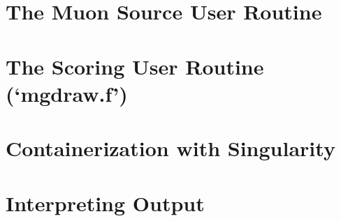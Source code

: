 \documentclass[10pt]{article}
\begin{document}
\part*{The Muon Source User Routine}

\part*{The Scoring User Routine (`mgdraw.f')}

\part*{Containerization with Singularity}

\part*{Interpreting Output}

    






% 
% 
\end{document}
